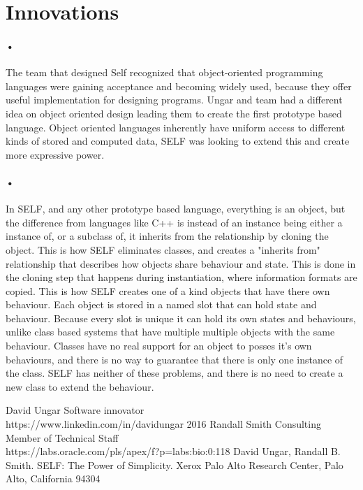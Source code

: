 \documentclass[12pt]{article}
\begin{document}
\section{Innovations}
\paragraph{•} The team that designed Self recognized that object-oriented programming languages were gaining acceptance and becoming widely used, because they offer useful implementation for designing programs. Ungar and team had a different idea on object oriented design leading them to create the first prototype based language. Object oriented languages inherently have uniform access to different kinds of stored and computed data, SELF was looking to extend this and create more expressive power. \cite{power}

\paragraph{•} In SELF, and any other prototype based language, everything is an object, but the difference from languages like C++ is instead of an instance being either a instance of, or a subclass of, it inherits from the relationship by cloning the object. This is how SELF eliminates classes, and creates a "inherits from" relationship that describes how objects share behaviour and state. This is done in the cloning step that happens during instantiation, where information formats are copied. This is how SELF creates one of a kind objects that have there own behaviour. Each object is stored in a named slot that can hold state and behaviour. Because every slot is unique it can hold its own states and behaviours, unlike class based systems that have multiple multiple objects with the same behaviour. Classes have no real support for an object to posses it's own behaviours, and there is no way to guarantee that there is only one instance of the class. SELF has neither of these problems, and there is no need to create a new class to extend the behaviour. \cite{power}

\begin{thebibliography}{9}
 David Ungar Software innovator\\ https://www.linkedin.com/in/davidungar 2016
 Randall Smith Consulting Member of Technical Staff \\ https://labs.oracle.com/pls/apex/f?p=labs:bio:0:118
 David Ungar, Randall B. Smith. SELF: The Power of Simplicity. Xerox Palo Alto Research Center, Palo Alto, California 94304
\end{thebibliography}
\end{document}
